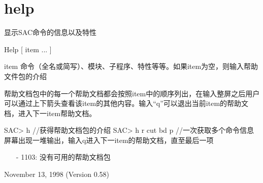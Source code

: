 \section{help}
\label{cmd:help}

显示SAC命令的信息以及特性

Help [ item ... ]

item 命令（全名或简写）、模块、子程序、特性等等。如果item为空，则输入帮助文件包的介绍

帮助文档包中的每一个帮助文档都会按照item中的顺序列出，在输入整屏之后用户可以通过上下箭头查看该item的其他内容。输入``q''可以退出当前item的帮助文档，进入下一item帮助文档。

\begin{SACCode}
SAC> h                  //获得帮助文档包的介绍
SAC> h r cut bd p       //一次获取多个命令信息
屏幕出现一堆输出，输入q进入下一item的帮助文档，直至最后一项
\end{SACCode}

\begin{itemize}
\item[-]1103: 没有可用的帮助文档包
\end{itemize}

November 13, 1998 (Version 0.58)
